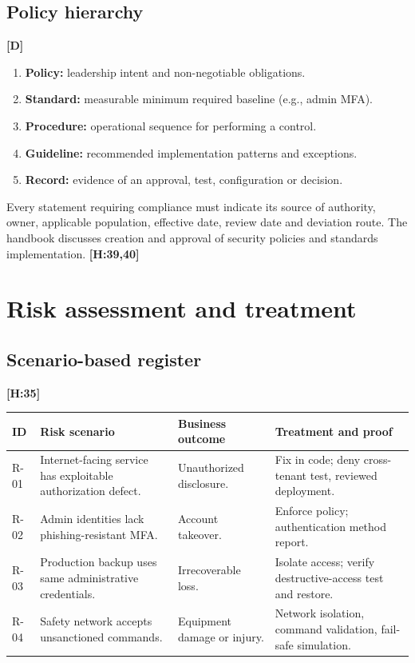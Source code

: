 \documentclass[10pt,letterpaper,oneside]{article}
\newcommand{\handbookref}[1]{\textsf{\color{accent}\textbf{[H:#1]}}}
\newcommand{\designed}{\textsf{\color{accent}\textbf{[D]}}}
\begin{document}
\subsection{Policy hierarchy}\designed{}
\begin{enumerate}
\item \textbf{Policy:} leadership intent and non-negotiable obligations.
\item \textbf{Standard:} measurable minimum required baseline (e.g., admin MFA).
\item \textbf{Procedure:} operational sequence for performing a control.
\item \textbf{Guideline:} recommended implementation patterns and exceptions.
\item \textbf{Record:} evidence of an approval, test, configuration or decision.
\end{enumerate}
Every statement requiring compliance must indicate its source of authority, owner, applicable population, effective date, review date and deviation route. The handbook discusses creation and approval of security policies and standards implementation. \handbookref{39,40}

\section{Risk assessment and treatment}
\subsection{Scenario-based register}\handbookref{35}
\par\medskip\noindent\begin{longtable}{@{}p{}>{\raggedright\arraybackslash}p{}>{\raggedright\arraybackslash}p{}>{\raggedright\arraybackslash}p{}@{}}\toprule
ID & Risk scenario & Business outcome & Treatment and proof \\ \midrule\endhead
R-01 & Internet-facing service has exploitable authorization defect. & Unauthorized disclosure. & Fix in code; deny cross-tenant test, reviewed deployment.\\
R-02 & Admin identities lack phishing-resistant MFA. & Account takeover. & Enforce policy; authentication method report.\\
R-03 & Production backup uses same administrative credentials. & Irrecoverable loss. & Isolate access; verify destructive-access test and restore.\\
R-04 & Safety network accepts unsanctioned commands. & Equipment damage or injury. & Network isolation, command validation, fail-safe simulation.\\
\bottomrule\end{longtable}\par\medskip
\end{document}
